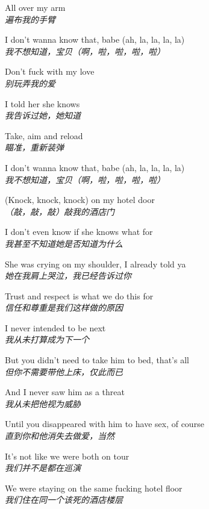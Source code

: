 \begin{spacing}{1.5}
\begin{flushleft}
All over my arm\\
\textit{遍布我的手臂}\lyricspace

I don't wanna know that, babe (ah, la, la, la, la)\\
\textit{我不想知道，宝贝（啊，啦，啦，啦，啦）}\lyricspace

Don't fuck with my love\\
\textit{别玩弄我的爱}\lyricspace

I told her she knows\\
\textit{我告诉过她，她知道}\lyricspace

Take, aim and reload\\
\textit{瞄准，重新装弹}\lyricspace

I don't wanna know that, babe (ah, la, la, la, la)\\
\textit{我不想知道，宝贝（啊，啦，啦，啦，啦）}\lyricspace

(Knock, knock, knock) on my hotel door\\
\textit{（敲，敲，敲）敲我的酒店门}\lyricspace

I don't even know if she knows what for\\
\textit{我甚至不知道她是否知道为什么}\lyricspace

She was crying on my shoulder, I already told ya\\
\textit{她在我肩上哭泣，我已经告诉过你}\lyricspace

Trust and respect is what we do this for\\
\textit{信任和尊重是我们这样做的原因}\lyricspace

I never intended to be next\\
\textit{我从未打算成为下一个}\lyricspace

But you didn't need to take him to bed, that's all\\
\textit{但你不需要带他上床，仅此而已}\lyricspace

And I never saw him as a threat\\
\textit{我从未把他视为威胁}\lyricspace

Until you disappeared with him to have sex, of course\\
\textit{直到你和他消失去做爱，当然}\lyricspace

It's not like we were both on tour\\
\textit{我们并不是都在巡演}\lyricspace

We were staying on the same fucking hotel floor\\
\textit{我们住在同一个该死的酒店楼层}\lyricspace


\end{flushleft}
\end{spacing}
